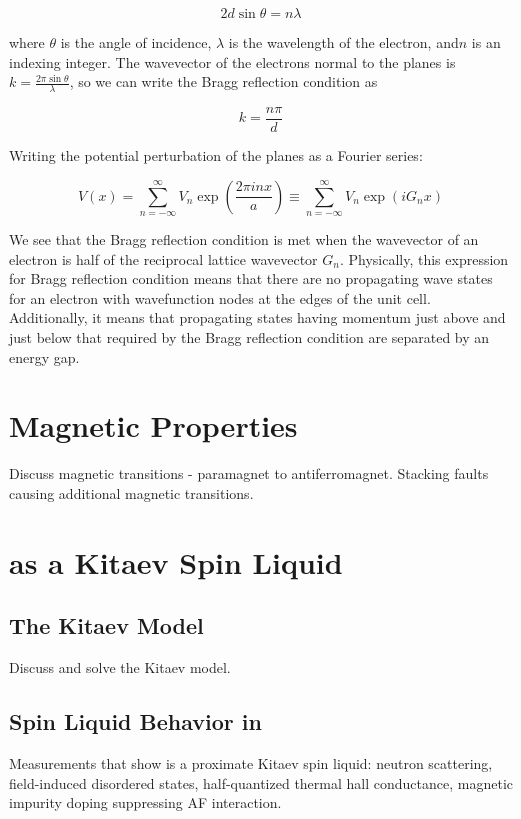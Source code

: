 \begin{equation}
2 d \sin \theta = n \lambda
\end{equation}

where $\theta$ is the angle of incidence, $\lambda$ is the wavelength of the electron, and$n$ is an indexing integer. The wavevector of the electrons normal to the planes is $k = \frac{2 \pi \sin \theta}{\lambda}$, so we can write the Bragg reflection condition as

\begin{equation}
k = \frac{n \pi}{d}
\end{equation} 

Writing the potential perturbation of the planes as a Fourier series:

\begin{equation}
V(x) = \sum_{n = -\infty}^{\infty} V_{n} \exp \left( \frac{2 \pi i n x}{a} \right) \equiv \sum_{n = -\infty}^{\infty} V_{n} \exp \left(i G_{n} x \right)
\end{equation}

We see that the Bragg reflection condition is met when the wavevector of an electron is half of the reciprocal lattice wavevector $G_{n}$. Physically, this expression for Bragg reflection condition means that there are no propagating wave states for an electron with wavefunction nodes at the edges of the unit cell. Additionally, it means that propagating states having momentum just above and just below that required by the Bragg reflection condition are separated by an energy gap.%



\section{Magnetic Properties}

Discuss magnetic transitions - paramagnet to antiferromagnet. Stacking faults causing additional magnetic transitions.

\section{\texorpdfstring{\rucl}{RuCl3} as a Kitaev Spin Liquid}

\subsection{The Kitaev Model}

Discuss and solve the Kitaev model.

\subsection{Spin Liquid Behavior in \texorpdfstring{\rucl}{RuCl3}}

Measurements that show \rucl is a proximate Kitaev spin liquid: neutron scattering, field-induced disordered states, half-quantized thermal hall conductance, magnetic impurity doping suppressing AF interaction.